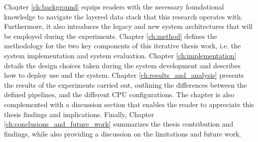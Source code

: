 Chapter \ref{ch:background} equips readers with the necessary foundational knowledge to navigate the layered data stack that this research operates with. Furthermore, it also introduces the legacy and new system architectures that will be employed during the experiments. Chapter \ref{ch:method} defines the methodology for the two key components of this iterative thesis work, i.e. the system implementation and system evaluation. Chapter \ref{ch:implementation} details the design choices taken during the system development and describes how to deploy use and the system.  
Chapter \ref{ch:results_and_analysis} presents the results of the experiments carried out, outlining the differences between the defined pipelines, and the different \gls{CPU} configurations. The chapter is also complemented with a discussion section that enables the reader to appreciate this thesis findings and implications. Finally, Chapter \ref{ch:conclusions_and_future_work} summarizes the thesis contribution and findings, while also providing a discussion on the limitations and future work.